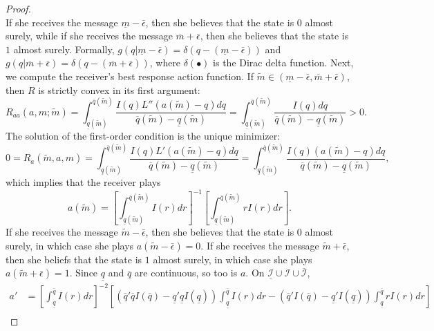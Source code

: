 \documentclass[12pt]{article}
\begin{document}
\begin{proof}
\begin{equation}
\end{equation}
If she receives the message $\underline{m}-\bar{\epsilon}$, then she believes that the state is $0$ almost surely, while if she receives the message $\overline{m}+\bar{\epsilon}$, then she believes that the state is $1$ almost surely. Formally, $g(q|\underline{m}-\bar{\epsilon})=\delta(q-(\underline{m}-\bar{\epsilon}))$ and $g(q|\overline{m}+\bar{\epsilon})=\delta(q-(\overline{m}+\bar{\epsilon}))$, where $\delta(\bullet)$ is the Dirac delta function. Next, we compute the receiver's best response action function. If $\tilde{m}\in(\underline{m}-\bar{\epsilon},\overline{m}+\bar{\epsilon})$, then $R$ is strictly convex in its first argument:
\begin{equation}
R_{aa}(a,m;\tilde{m})=\int_{\underline{q}(\tilde{m})}^{\overline{q}(\tilde{m})}{\frac{I(q)L''(a(\tilde{m})-q)dq}{\overline{q}(\tilde{m})-\underline{q}(\tilde{m})}}=\int_{\underline{q}(\tilde{m})}^{\overline{q}(\tilde{m})}{\frac{I(q)dq}{\overline{q}(\tilde{m})-\underline{q}(\tilde{m})}}>0.
\end{equation}
The solution of the first-order condition is the unique minimizer:
\begin{equation}
0=R_{a}(\tilde{m},a,m)=\int_{\underline{q}(\tilde{m})}^{\overline{q}(\tilde{m})}{\frac{I(q)L'(a(\tilde{m})-q)dq}{\overline{q}(\tilde{m})-\underline{q}(\tilde{m})}}=\int_{\underline{q}(\tilde{m})}^{\overline{q}(\tilde{m})}{\frac{I(q)(a(\tilde{m})-q)dq}{\overline{q}(\tilde{m})-\underline{q}(\tilde{m})}},
\end{equation}
which implies that the receiver plays
\begin{equation}
a(\tilde{m})=\left[\int_{\underline{q}(\tilde{m})}^{\overline{q}(\tilde{m})}{I(r)dr}\right]^{-1}\left[\int_{\underline{q}(\tilde{m})}^{\overline{q}(\tilde{m})}{rI(r)dr}\right].
\end{equation}
If she receives the message $\tilde{m}-\bar{\epsilon}$, then she believes that the state is $0$ almost surely, in which case she plays $a(\tilde{m}-\bar{\epsilon})=0$. If she receives the message $\tilde{m}+\bar{\epsilon}$, then she beliefs that the state is $1$ almost surely, in which case she plays $a(\tilde{m}+\bar{\epsilon})=1$. Since $\underline{q}$ and $\overline{q}$ are continuous, so too is $a$. On $\underline{\mathcal{I}}\cup\mathcal{I}\cup\overline{\mathcal{I}}$, 
\begin{align}
a'&=\left[\int_{\underline{q}}^{\overline{q}}{I(r)dr}\right]^{-2}\left[(\overline{q}'\overline{q}I(\overline{q})-\underline{q}'\underline{q}I(\underline{q}))\int_{\underline{q}}^{\overline{q}}{I(r)dr}-(\overline{q}'I(\overline{q})-\underline{q}'I(\underline{q}))\int_{\underline{q}}^{\overline{q}}{rI(r)dr}\right]\\

\end{align}
\end{proof}
\end{document}

